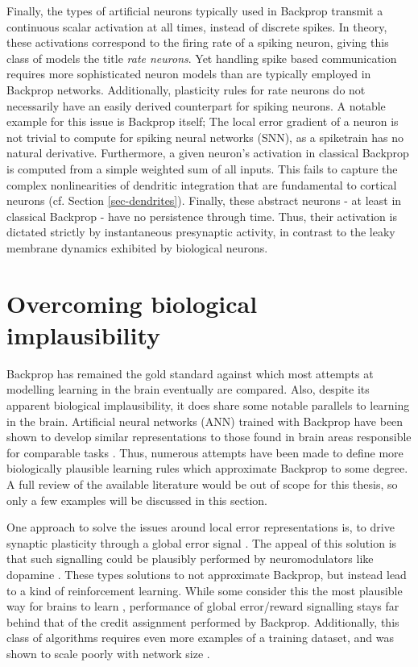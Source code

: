 Finally, the types of artificial neurons typically used in Backprop transmit a continuous scalar activation at all
times, instead of discrete spikes. In theory, these activations correspond to the firing rate of a spiking neuron,
giving this class of models the title \textit{rate neurons}. Yet handling spike based communication requires more
sophisticated neuron models than are typically employed in Backprop networks. Additionally, plasticity rules for rate
neurons do not necessarily have an easily derived counterpart for spiking neurons. A notable example for this issue is
Backprop itself; The local error gradient of a neuron is not trivial to compute for spiking neural networks (SNN), as a
spiketrain has no natural derivative. Furthermore, a given neuron's activation in classical Backprop is computed from a
simple weighted sum of all inputs. This fails to capture the complex nonlinearities of dendritic integration that are
fundamental to cortical neurons (cf. Section \ref{sec-dendrites}). Finally, these abstract neurons - at least in
classical Backprop - have no persistence through time. Thus, their activation is dictated strictly by instantaneous
presynaptic activity, in contrast to the leaky membrane dynamics exhibited by biological neurons.


\section{Overcoming biological implausibility}

Backprop has remained the gold standard against which most attempts at modelling learning in the brain eventually are
compared. Also, despite its apparent biological implausibility, it does share some notable parallels to learning in the
brain. Artificial neural networks (ANN) trained with Backprop have been shown to develop similar representations to
those found in brain areas responsible for comparable tasks
\citep{Yamins2016,Whittington2018,KhalighRazavi2014,Kubilius2016}. Thus, numerous attempts have been made to define more
biologically plausible learning rules which approximate Backprop to some degree. A full review of the available
literature would be out of scope for this thesis, so only a few examples will be discussed in this section. \newline


\noindent One approach to solve the issues around local error representations is, to drive synaptic plasticity through a
global error signal \citep{potjans2011imperfect,mozafari2018combining,sutton2018reinforcement}. The appeal of this
solution is that such signalling could be plausibly performed by neuromodulators like dopamine
\citep{Mazzoni1991,Seung2003,izhikevich2007solving}. These types solutions to not approximate Backprop, but instead lead
to a kind of reinforcement learning. While some consider this the most plausible way for brains to learn
\citep{sutton2018reinforcement}, performance of global error/reward signalling stays far behind that of the credit
assignment performed by Backprop. Additionally, this class of algorithms requires even more examples of a training
dataset, and was shown to scale poorly with network size \citep{Werfel2003}.

